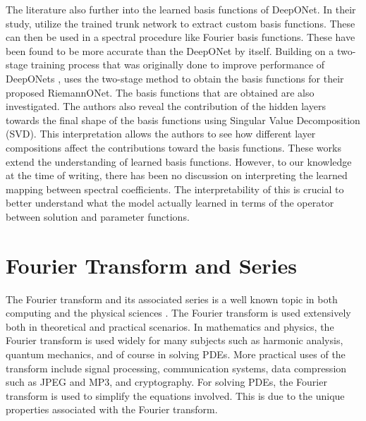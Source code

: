 The literature also further into the learned basis functions of DeepONet. In their study, \textcite{meurisMachinelearningbasedSpectralMethods2023} utilize the trained trunk network to extract custom basis functions. These can then be used in a spectral procedure like Fourier basis functions. These have been found to be more accurate than the DeepONet by itself. Building on a two-stage training process that was originally done to improve performance of DeepONets \autocite{leeTrainingGeneralizationDeep2024}, \textcite{peyvanRiemannONetsInterpretableNeural2024} uses the two-stage method to obtain the basis functions for their proposed RiemannONet. The basis functions that are obtained are also investigated. The authors also reveal the contribution of the hidden layers towards the final shape of the basis functions using Singular Value Decomposition (SVD). This interpretation allows the authors to see how different layer compositions affect the contributions toward the basis functions. These works extend the understanding of learned basis functions. However, to our knowledge at the time of writing, there has been no discussion on interpreting the learned mapping between spectral coefficients. The interpretability of this is crucial to better understand what the model actually learned in terms of the operator between solution and parameter functions.

\section{Fourier Transform and Series}\label{sec:fourier_discussion}
\noindent The Fourier transform and its associated series is a well known topic in both computing and the physical sciences \autocite{smithMathematicsDiscreteFourier2007}. The Fourier transform is used extensively both in theoretical and practical scenarios. In mathematics and physics, the Fourier transform is used widely for many subjects such as harmonic analysis, quantum mechanics, and of course in solving PDEs. More practical uses of the transform include signal processing, communication systems, data compression such as JPEG and MP3, and cryptography. For solving PDEs, the Fourier transform is used to simplify the equations involved. This is due to the unique properties associated with the Fourier transform.

